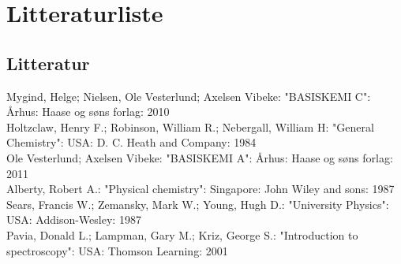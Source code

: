 \section{Litteraturliste}
\subsection*{Litteratur}
Mygind, Helge; Nielsen, Ole Vesterlund; Axelsen Vibeke: "BASISKEMI C": Århus: Haase og søns forlag: 2010
\\

Holtzclaw, Henry F.; Robinson, William R.; Nebergall, William H: "General Chemistry": USA: D. C. Heath and Company: 1984
\\

Ole Vesterlund; Axelsen Vibeke: "BASISKEMI A": Århus: Haase og søns forlag: 2011
\\

Alberty, Robert A.: "Physical chemistry": Singapore: John Wiley and sons: 1987
\\

Sears, Francis W.; Zemansky, Mark W.; Young, Hugh D.: "University Physics": USA: Addison-Wesley: 1987
\\

Pavia, Donald L.; Lampman, Gary M.; Kriz, George S.: "Introduction to spectroscopy": USA: Thomson Learning: 2001
